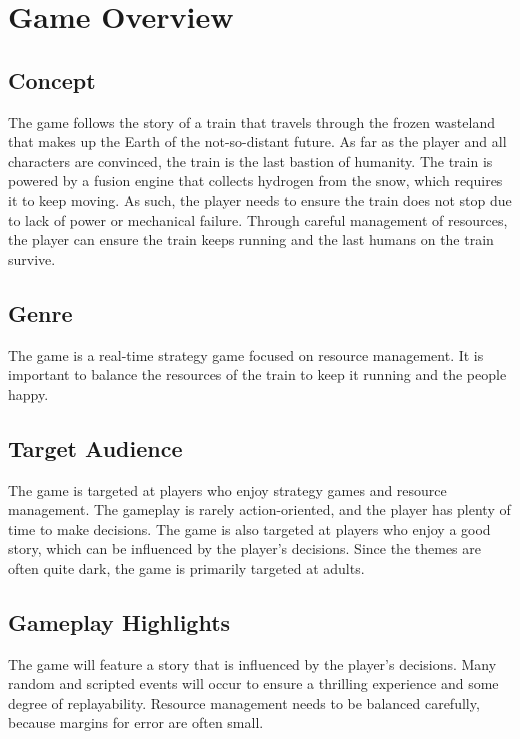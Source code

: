 \chapter{Game Overview}\label{ch:overview}

\section{Concept}

The game follows the story of a train that travels through the frozen wasteland that makes up the Earth of the not-so-distant future.
As far as the player and all characters are convinced, the train is the last bastion of humanity.
The train is powered by a fusion engine that collects hydrogen from the snow, which requires it to keep moving.
As such, the player needs to ensure the train does not stop due to lack of power or mechanical failure.
Through careful management of resources, the player can ensure the train keeps running and the last humans on the train survive.

\section{Genre}

The game is a real-time strategy game focused on resource management.
It is important to balance the resources of the train to keep it running and the people happy.

\section{Target Audience}

The game is targeted at players who enjoy strategy games and resource management.
The gameplay is rarely action-oriented, and the player has plenty of time to make decisions.
The game is also targeted at players who enjoy a good story, which can be influenced by the player's decisions.
Since the themes are often quite dark, the game is primarily targeted at adults.

\section{Gameplay Highlights}

The game will feature a story that is influenced by the player's decisions.
Many random and scripted events will occur to ensure a thrilling experience and some degree of replayability.
Resource management needs to be balanced carefully, because margins for error are often small.

